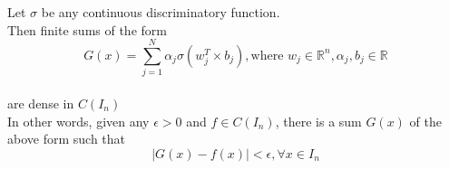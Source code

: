 \begin{algorithm}[h]
\centering
    \caption{Cybenko's Theorem}
    \begin{algorithmic}
        Let $\sigma$ be any continuous discriminatory function. \\
        Then finite sums of the form \\
        \begin{equation*}
            G(x) = \sum_{j=1}^N \alpha_j \sigma(w_j^T \times b_j), \text{where } w_j \in \mathbb{R}^n, \alpha_j, b_j \in \mathbb{R}
        \end{equation*} \\
        are dense in $C(I_n)$ \\
        In other words, given any $\epsilon  > 0$ and $f \in C(I_n)$, there is a sum $G(x)$ of the above form such that \\
        \begin{equation*}
            |G(x) - f(x)| < \epsilon, \forall x \in I_n
        \end{equation*}

    \end{algorithmic}
\end{algorithm}
